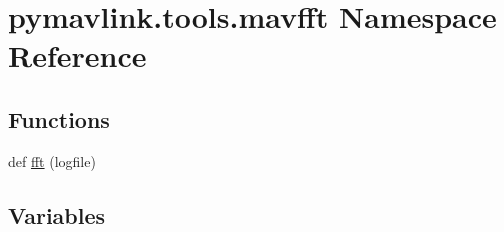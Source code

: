 \hypertarget{namespacepymavlink_1_1tools_1_1mavfft}{}\section{pymavlink.\+tools.\+mavfft Namespace Reference}
\label{namespacepymavlink_1_1tools_1_1mavfft}
\subsection*{Functions}
\begin{DoxyCompactItemize}
\item 
def \hyperlink{namespacepymavlink_1_1tools_1_1mavfft_a319827e54762dc95afaa783e0ff75ca0}{fft} (logfile)
\end{DoxyCompactItemize}
\subsection*{Variables}
